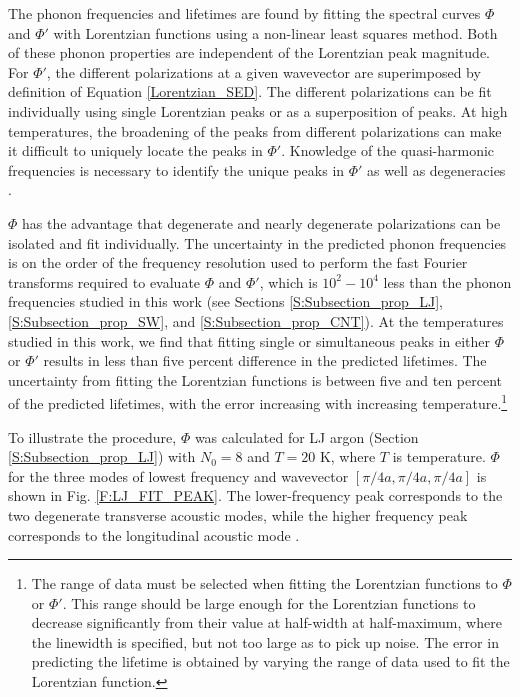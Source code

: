 The phonon frequencies and lifetimes are found by fitting the spectral 
curves $\Phi$ and 
$\Phi'$ with Lorentzian functions using a non-linear least squares method. 
Both of these 
phonon properties are independent of the Lorentzian peak magnitude. For 
$\Phi'$, the different 
polarizations at a given wavevector are superimposed by definition of 
Equation \eqref{Lorentzian_SED}. 
The different polarizations can be fit individually using single Lorentzian 
peaks or as a 
superposition of peaks. At high temperatures, the broadening of the peaks 
from different 
polarizations can make it difficult to uniquely locate the peaks in 
$\Phi'$. Knowledge of the 
quasi-harmonic frequencies is necessary to identify the unique peaks in 
$\Phi'$ as well as 
degeneracies \cite{mcgaughey_phonon_2006,turney_predicting_2009}.

$\Phi$ has the advantage that degenerate and nearly degenerate 
polarizations can be 
isolated and fit individually. The uncertainty in the predicted phonon 
frequencies is 
on the order of the frequency resolution used to perform the fast Fourier 
transforms 
required to evaluate $\Phi$ and $\Phi'$, which is $10^2-10^4$ less than 
the phonon frequencies 
studied in this work (see Sections \ref{S:Subsection_prop_LJ}, 
\ref{S:Subsection_prop_SW}, 
and \ref{S:Subsection_prop_CNT}). At the temperatures studied in this work, 
we find that 
fitting single or simultaneous peaks in either $\Phi$ or $\Phi'$ results 
in less than five 
percent difference in the predicted lifetimes. The uncertainty from 
fitting the Lorentzian 
functions is between five and ten percent of the predicted lifetimes, 
with the error increasing 
with increasing temperature.\footnote[1]{The range of data must be selected 
when fitting the 
Lorentzian functions to $\Phi$ or $\Phi'$. This range should be large 
enough for the Lorentzian 
functions to decrease significantly from their value at
half-width at half-maximum, where the linewidth is specified, but not 
too large as to pick up 
noise. The error in predicting the lifetime is obtained by varying the 
range of data
used to fit the Lorentzian function.}

To illustrate the procedure, $\Phi$ was calculated for LJ argon (Section 
\ref{S:Subsection_prop_LJ}) with $N_0=8$ and $T=20$ K, where $T$ is 
temperature. 
$\Phi$ for the three modes of lowest frequency and wavevector 
$[\pi/4a,\pi/4a,\pi/4a]$ 
is shown in Fig$.$ \ref{F:LJ_FIT_PEAK}. The lower-frequency peak 
corresponds to the two 
degenerate transverse acoustic modes, while the higher frequency peak 
corresponds to the 
longitudinal acoustic mode \cite{dove_introduction_1993}.


